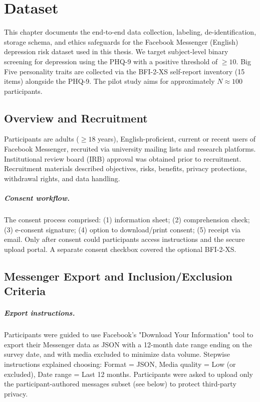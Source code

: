 \chapter{Dataset}
\label{chap:dataset}

This chapter documents the end-to-end data collection, labeling, de-identification, storage schema, and ethics safeguards for the Facebook Messenger (English) depression risk dataset used in this thesis. We target subject-level binary screening for depression using the PHQ-9 with a positive threshold of \(\geq 10\). Big Five personality traits are collected via the BFI-2-XS self-report inventory (15 items) alongside the PHQ-9. The pilot study aims for approximately \(N\approx100\) participants.

\section{Overview and Recruitment}
\label{sec:dataset-overview}
Participants are adults (\(\geq 18\) years), English-proficient, current or recent users of Facebook Messenger, recruited via university mailing lists and research platforms. Institutional review board (IRB) approval was obtained prior to recruitment. Recruitment materials described objectives, risks, benefits, privacy protections, withdrawal rights, and data handling.

\paragraph{Consent workflow.}
The consent process comprised: (1) information sheet; (2) comprehension check; (3) e-consent signature; (4) option to download/print consent; (5) receipt via email. Only after consent could participants access instructions and the secure upload portal. A separate consent checkbox covered the optional BFI-2-XS.

\section{Messenger Export and Inclusion/Exclusion Criteria}
\label{sec:dataset-inclusion}
\paragraph{Export instructions.} Participants were guided to use Facebook's "Download Your Information" tool to export their Messenger data as JSON with a 12-month date range ending on the survey date, and with media excluded to minimize data volume. Stepwise instructions explained choosing: Format = JSON, Media quality = Low (or excluded), Date range = Last 12 months. Participants were asked to upload only the participant-authored messages subset (see below) to protect third-party privacy.

